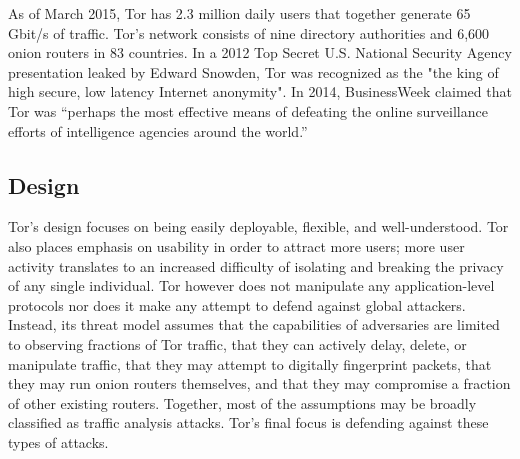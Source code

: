 As of March 2015, Tor has 2.3 million daily users that together generate 65 Gbit/s of traffic. Tor's network consists of nine directory authorities and 6,600 onion routers in 83 countries\cite{TorMetrics}. In a 2012 Top Secret U.S. National Security Agency presentation leaked by Edward Snowden, Tor was recognized as the "the king of high secure, low latency Internet anonymity"\cite{landau2014highlights}\cite{plak2014anonymous}. In 2014, BusinessWeek claimed that Tor was ``perhaps the most effective means of defeating the online surveillance efforts of intelligence agencies around the world.''\cite{TorBusinessWeek}

\subsection{Design}

Tor's design focuses on being easily deployable, flexible, and well-understood. Tor also places emphasis on usability in order to attract more users; more user activity translates to an increased difficulty of isolating and breaking the privacy of any single individual. Tor however does not manipulate any application-level protocols nor does it make any attempt to defend against global attackers. Instead, its threat model assumes that the capabilities of adversaries are limited to observing fractions of Tor traffic, that they can actively delay, delete, or manipulate traffic, that they may attempt to digitally fingerprint packets, that they may run onion routers themselves, and that they may compromise a fraction of other existing routers. Together, most of the assumptions may be broadly classified as traffic analysis attacks. Tor's final focus is defending against these types of attacks\cite{dingledine2004tor}.

